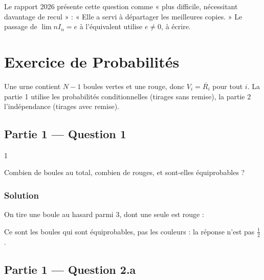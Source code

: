 \documentclass[11pt,a4paper]{article}
\newcommand{\equationajustee}[1]{%
  \sbox{\boiteequation}{$\displaystyle #1$}%
  \ifdim\wd\boiteequation>\linewidth
    \[\resizebox{\linewidth}{!}{\usebox{\boiteequation}}\]%
  \else
    \[#1\]%
  \fi}
\begin{document}
\begin{jury}

Le rapport 2026 présente cette question comme « plus difficile, nécessitant davantage de recul » : « Elle a servi à départager les meilleures copies. » Le passage de \(\lim nI_n=e\) à l'équivalent utilise \(e\neq0\), à écrire.

\end{jury}

\hypertarget{exercice-de-probabilituxe9s}{%
\section{Exercice de Probabilités}\label{exercice-de-probabilituxe9s}}

Une urne contient \(N-1\) boules vertes et une rouge, donc \(V_i=\overline{R_i}\) pour tout \(i\). La partie 1 utilise les probabilités conditionnelles (tirages sans remise), la partie 2 l'indépendance (tirages avec remise).

\hypertarget{partie-1-question-1}{%
\subsection{Partie 1 --- Question 1}\label{partie-1-question-1}}

\begin{indication}{1}

Combien de boules au total, combien de rouges, et sont-elles équiprobables ?

\end{indication}

\hypertarget{solution-22}{%
\subsubsection{Solution}\label{solution-22}}

On tire une boule au hasard parmi 3, dont une seule est rouge :

\equationajustee{\boxed{P(R_1)=\frac13.}}

\begin{piege}

Ce sont les boules qui sont équiprobables, pas les couleurs : la réponse n'est pas \(\frac12\).

\end{piege}

\hypertarget{partie-1-question-2.a}{%
\subsection{Partie 1 --- Question 2.a}\label{partie-1-question-2.a}}
\end{document}
